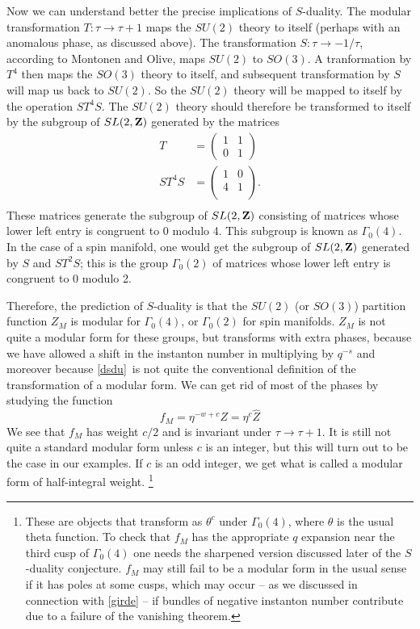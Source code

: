 \documentclass[12pt]{article}
\numberwithin{equation}{section}
\begin{document}
Now we can understand better the precise implications of $S$-duality.
The modular transformation $T:\tau\to\tau+1$ maps the $SU(2)$
theory to itself (perhaps with an anomalous phase, as discussed above).
The transformation $S:\tau\to -1/\tau$, according to Montonen and Olive,
maps $SU(2)$ to $SO(3)$.  A tranformation by $T^4$ then maps the $SO(3)$
theory to itself, and subsequent transformation by $S$ will map us back
to $SU(2)$.  So the $SU(2)$ theory will be mapped to itself by the
operation $ST^4S$.
The $SU(2)$ theory should therefore be transformed to itself by the subgroup
of $SL(2,{\bf Z})$ generated by the matrices
\begin{equation}
  \label{nogoood}
  \begin{aligned}T & =
    \begin{pmatrix}1 & 1 \\ 0 & 1
    \end{pmatrix}\\ ST^4S& =
    \begin{pmatrix}1 & 0\\ 4 & 1\\
    \end{pmatrix}.\\
  \end{aligned}
\end{equation}
These matrices generate the subgroup of $SL(2,{\bf Z})$ consisting
of matrices whose lower left entry is congruent to $0$ modulo 4.
This subgroup is known as $\Gamma_0(4)$.
In the case of a spin manifold, one would get the subgroup of $SL(2,{\bf Z})$
generated by $S$ and $ST^2S$; this is the group $\Gamma_0(2)$ of matrices
whose lower left entry is congruent to 0 modulo 2.

Therefore, the prediction of $S$-duality is that the $SU(2)$
(or $SO(3)$) partition function $Z_M$ is modular for $\Gamma_0(4)$,
or $\Gamma_0(2)$ for spin manifolds.
$Z_M$ is not quite a modular form for these groups, but transforms
with extra phases,
because we have allowed
a shift in the instanton number in multiplying by
$q^{-s}$ and moreover because
\eqref{dsdu}\ is not quite the conventional
definition of the transformation of a modular form.
We can get rid of most of the phases by studying the function
%
\begin{equation}
  \label{dff}
  f_M=\eta^{-w+c} Z={\eta^c {\hat Z} }
\end{equation}
%
We see that $f_M$ has
weight $c/2$ and  is invariant under $\tau \rightarrow \tau+1$.
It is still not quite a standard modular form unless
$c$ is an integer, but this will turn out to be the case in our examples.
If $c$ is an odd integer, we get what is called a modular form of
half-integral weight.
\footnote{These are objects that transform as $\theta^c$ under
  $\Gamma_0(4)$, where $\theta$ is the usual theta function. To check
  that $f_M$ has the appropriate $q$ expansion near the third cusp of
  $\Gamma_0(4)$ one needs the sharpened version discussed later of the
  $S$-duality conjecture.  $f_M$ may still fail to be a modular form in
  the usual sense if it has poles at some cusps, which may occur -- as
  we discussed in connection with \eqref{girde} -- if bundles of
negative instanton number contribute due to a failure of the vanishing theorem.}
\end{document}

